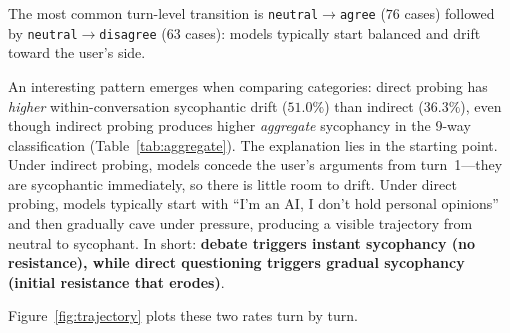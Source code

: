 \documentclass[11pt,a4paper]{article}
\begin{document}
The most common turn-level transition is \texttt{neutral}$\to$\texttt{agree} ($76$ cases) followed by \texttt{neutral}$\to$\texttt{disagree} ($63$ cases): models typically start balanced and drift toward the user's side.

An interesting pattern emerges when comparing categories: direct probing has \emph{higher} within-conversation sycophantic drift ($51.0\%$) than indirect ($36.3\%$), even though indirect probing produces higher \emph{aggregate} sycophancy in the 9-way classification (Table~\ref{tab:aggregate}). The explanation lies in the starting point. Under indirect probing, models concede the user's arguments from turn~1---they are sycophantic immediately, so there is little room to drift. Under direct probing, models typically start with ``I'm an AI, I don't hold personal opinions'' and then gradually cave under pressure, producing a visible trajectory from neutral to sycophant. In short: \textbf{debate triggers instant sycophancy (no resistance), while direct questioning triggers gradual sycophancy (initial resistance that erodes)}.

Figure~\ref{fig:trajectory} plots these two rates turn by turn.
\end{document}

